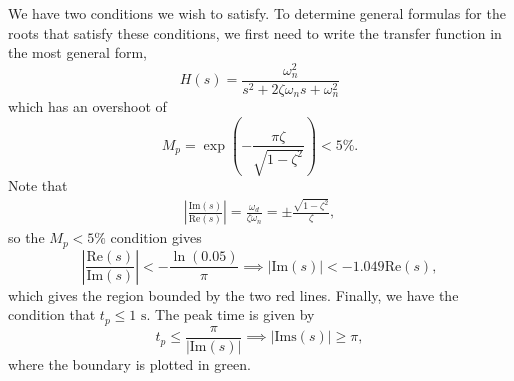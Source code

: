 \documentclass{article}
\numberwithin{equation}{section}
\begin{document}
\begin{enumerate}[label=\textbf{1.\arabic*}]
\begin{enumerate}[label=(\alph*)]
        We have two conditions we wish to satisfy. To determine general formulas for the roots that satisfy these conditions, we first need to write the transfer function in the most general form,
        \begin{equation}
            H(s) = \frac{\omega_n^2}{s^2 + 2\zeta\omega_n s + \omega_n^2}
        \end{equation}
        which has an overshoot of 
        \begin{equation}
            M_p = \exp\left(-\frac{\pi\zeta}{\sqrt{1-\zeta^2}}\right) < 5\%.
        \end{equation}
        Note that 
        \begin{align}
            \left|\frac{\text{Im}(s)}{\text{Re}(s)}\right| = \frac{\omega_d}{\zeta\omega_n} = \pm\frac{\sqrt{1-\zeta^2}}{\zeta},
        \end{align}
        so the $M_p<5\%$ condition gives 
        \begin{equation}
            \left|\frac{\text{Re}(s)}{\text{Im}(s)}\right| < -\frac{\ln(0.05)}{\pi} \implies |\text{Im}(s)| < -1.049\text{Re}(s),
        \end{equation}
        which gives the region bounded by the two red lines. Finally, we have the condition that $t_p \le 1\text{ s}.$ The peak time is given by 
        \begin{equation}
            t_p \le \frac{\pi}{|\text{Im}(s)|} \implies |\text{Ims}(s)| \ge \pi,
        \end{equation}
        where the boundary is plotted in green.
        \begin{center}
\end{center}
\end{enumerate}
\end{enumerate}
\end{document}
